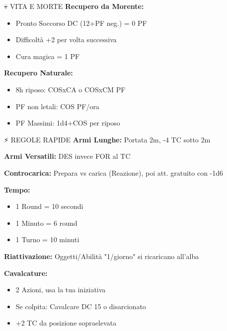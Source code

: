 \documentclass[10pt,a4paper,landscape]{article}
\begin{document}
\begin{multicols}{4}
\begin{mainsection}{💀 VITA E MORTE}
			\textbf{Recupero da Morente:}
			\begin{itemize}[noitemsep,leftmargin=8pt]
				\item Pronto Soccorso DC (12+PF neg.) = 0 PF
				\item Difficoltà +2 per volta successiva
				\item Cura magica = 1 PF
			\end{itemize}
			
			\textbf{Recupero Naturale:}
			\begin{itemize}[noitemsep,leftmargin=8pt]
				\item 8h riposo: COSxCA o COSxCM PF
				\item PF non letali: COS PF/ora
				\item PF Massimi: 1d4+COS per riposo
			\end{itemize}
		\end{mainsection}
		
		\begin{mainsection}{⚡ REGOLE RAPIDE}
			\textbf{Armi Lunghe:} Portata 2m, -4 TC sotto 2m
			
			\textbf{Armi Versatili:} DES invece FOR al TC
			
			\textbf{Controcarica:} Prepara vs carica (Reazione), poi att. gratuito con -1d6
			
			\medskip
			
			\textbf{Tempo:}
			\begin{itemize}[noitemsep,leftmargin=8pt]
				\item 1 Round = 10 secondi
				\item 1 Minuto = 6 round
				\item 1 Turno = 10 minuti
			\end{itemize}
			
			\textbf{Riattivazione:} Oggetti/Abilità "1/giorno" si ricaricano all'alba
			
			\medskip
			
			\textbf{Cavalcature:}
			\begin{itemize}[noitemsep,leftmargin=8pt]
				\item 2 Azioni, usa la tua iniziativa
				\item Se colpita: Cavalcare DC 15 o disarcionato
				\item +2 TC da posizione sopraelevata
			\end{itemize}
		\end{mainsection}
		
	\end{multicols}
	
\end{document}
